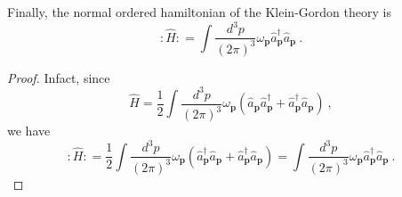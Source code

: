     Finally, the normal ordered hamiltonian of the Klein-Gordon theory is 
    \begin{equation} \label{hamop}
        \colon \hat H \colon = \int \frac{d^3 p}{(2\pi)^3} \omega_{\mathbf p} \hat a_{\mathbf p}^\dagger \hat a_{\mathbf p} ~.
    \end{equation}
    \begin{proof}
        Infact, since
        \begin{equation*}
            \hat H = \frac{1}{2} \int \frac{d^3 p}{(2\pi)^3} \omega_{\mathbf p} (\hat a_{\mathbf p} \hat a_{\mathbf p}^\dagger + \hat a_{\mathbf p}^\dagger \hat a_{\mathbf p}) ~,
        \end{equation*}
        we have 
        \begin{equation*}
            \colon \hat H \colon = \frac{1}{2} \int \frac{d^3 p}{(2\pi)^3} \omega_{\mathbf p} (\hat a_{\mathbf p}^\dagger \hat a_{\mathbf p} + \hat a_{\mathbf p}^\dagger \hat a_{\mathbf p}) = \int \frac{d^3 p}{(2\pi)^3} \omega_{\mathbf p} \hat a_{\mathbf p}^\dagger \hat a_{\mathbf p} ~.
        \end{equation*}
    \end{proof}

